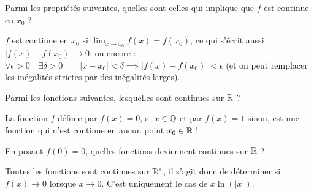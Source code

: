 \begin{question}
Parmi les propriétés suivantes, quelles sont celles qui implique que $f$ est continue en $x_ 0$ ?
\begin{answers}



    
\end{answers}
\begin{explanations}
$f$ est continue en $x_0$ si $\lim_{x\to x_0} f(x) = f(x_0)$, ce qui s'écrit aussi $\big| f(x) - f(x_0) \big| \to 0$, ou encore :
$\forall \epsilon >0 \quad \exists \delta > 0 \qquad
    |x-x_0| < \delta \implies |f(x)-f(x_0)| < \epsilon$ (et on peut remplacer les inégalités strictes par des inégalités larges).
\end{explanations}
\end{question}


\begin{question}
Parmi les fonctions suivantes, lesquelles sont continues sur $\mathbb{R}$ ?
\begin{answers}



   
\end{answers}
\begin{explanations}
La fonction $f$ définie par $f(x) = 0$, si $x\in \mathbb{Q}$ et par $f(x)=1$ sinon, est une fonction qui n'est continue en aucun point $x_0\in \mathbb{R}$ !
\end{explanations}
\end{question}


\begin{question}
En posant $f(0)=0$, quelles fonctions deviennent continues sur $\mathbb{R}$ ?
\begin{answers}



\end{answers}
\begin{explanations}
Toutes les fonctions sont  continues sur $\mathbb{R}^*$, il s'agit donc de déterminer si $f(x) \to 0$ lorsque $x\to0$. C'est uniquement le cas de $x \ln( |x|)$.
\end{explanations}
\end{question}




